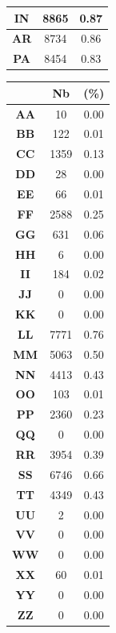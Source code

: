 \documentclass[a4paper, titlepage]{livret}
\begin{document}
\begin{center}
\begin{minipage}[c]{.3\linewidth}
\begin{tabular}{|c|c|c|}
	\hline
	\textbf{IN} &    8865 &  0.87\\
	\hline
	\textbf{AR} &    8734 &  0.86\\
	\hline
	\textbf{PA} &    8454 &  0.83\\
	\hline
\end{tabular}
  \label{tab19}
\end{minipage}
\begin{minipage}[c]{.3\linewidth}
 \begin{tabular}{|c|c|c|}
 \hline
	& \textbf{Nb} & \textbf{(\%)}\\
	\hline
	\textbf{AA} &      10 &  0.00\\
	\hline
	\textbf{BB} &     122 &  0.01\\
	\hline
	\textbf{CC} &    1359 &  0.13\\
	\hline
	\textbf{DD} &      28 &  0.00\\
	\hline
	\textbf{EE} &      66 &  0.01\\
	\hline
	\textbf{FF} &    2588 &  0.25\\
	\hline
	\textbf{GG} &     631 &  0.06\\
	\hline
	\textbf{HH} &       6 &  0.00\\
	\hline
	\textbf{II} &     184 &  0.02\\
	\hline
	\textbf{JJ} &       0 &  0.00\\
	\hline
	\textbf{KK} &       0 &  0.00\\
	\hline
	\textbf{LL} &    7771 &  0.76\\
	\hline
	\textbf{MM} &    5063 &  0.50\\
	\hline
	\textbf{NN} &    4413 &  0.43\\
	\hline
	\textbf{OO} &     103 &  0.01\\
	\hline
	\textbf{PP} &    2360 &  0.23\\
	\hline
	\textbf{QQ} &       0 &  0.00\\
	\hline
	\textbf{RR} &    3954 &  0.39\\
	\hline
	\textbf{SS} &    6746 &  0.66\\
	\hline
	\textbf{TT} &    4349 &  0.43\\
	\hline
	\textbf{UU} &       2 &  0.00\\
	\hline
	\textbf{VV} &       0 &  0.00\\
	\hline
	\textbf{WW} &       0 &  0.00\\
	\hline
	\textbf{XX} &      60 &  0.01\\
	\hline
	\textbf{YY} &       0 &  0.00\\
	\hline
	\textbf{ZZ} &       0 &  0.00\\
	\hline
\end{tabular}
  \label{tab20}
\end{minipage}
\end{center}
\end{document}
